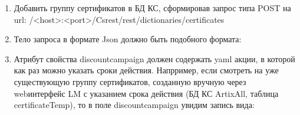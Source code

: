 \documentclass[twoside,11pt,a4paper,notitlepage]{report}
\begin{document}
\begin{enumerate}
%
\item {} 
\sphinxAtStartPar
Добавить группу сертификатов в БД КС, сформировав запрос типа POST на url: /\textless{}host\textgreater{}:\textless{}port\textgreater{}/Csrest/rest/dictionaries/certificates

\item {} 
\sphinxAtStartPar
Тело запроса в формате Json должно быть подобного формата:
\begin{quote}

\begin{sphinxVerbatim}[commandchars=\\\{\}]
\end{sphinxVerbatim}
\end{quote}

\item {} 
\sphinxAtStartPar
Атрибут свойства  discountcampaign должен содержать yaml акции, в которой как раз можно указать сроки действия.
Напрример, если смотреть на уже существующую группу сертификатов, созданную вручную через web\sphinxhyphen{}интерфейс LM с указанием срока действия (БД КС ArtixAll, таблица certificateTemp), то в поле discountcampaign увидим запись вида:
\begin{quote}


\end{quote}
\end{enumerate}
\end{document}
